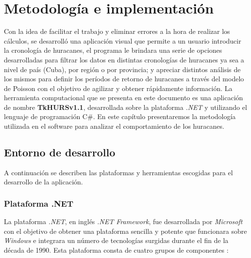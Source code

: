 \chapter{Metodología e implementación}
Con la idea de facilitar el trabajo y eliminar errores a la hora de realizar los cálculos, se desarrolló una aplicación visual que permite a un usuario introducir la cronología de huracanes, el programa le brindara una serie de opciones desarrolladas para filtrar los datos en distintas cronologías de huracanes ya sea a nivel de país (Cuba), por región o por provincia; y apreciar distintos análisis de los mismos para definir los períodos de retorno de huracanes a través del modelo de Poisson con el objetivo de agilizar y obtener rápidamente información. 
La herramienta computacional que se presenta en este documento es una aplicación de nombre \textbf{TkHURSv1.1}, desarrollada sobre la plataforma \textit{.NET} y utilizando el lenguaje de programación C\#. En este capítulo presentaremos la metodología utilizada en el software para analizar el comportamiento de los huracanes. 

\section{Entorno de desarrollo}
A continuación se describen las plataformas y herramientas escogidas para el desarrollo de la aplicación. 

\subsection{Plataforma .NET}

La plataforma  \textit{.NET}, en inglés \textit{.NET Framework}, fue desarrollada por \textit{Microsoft} con el objetivo de obtener una plataforma sencilla y potente que funcionara sobre \textit{Windows} e integrara un número de tecnologías surgidas durante el fin de la década de 1990. Esta plataforma consta de cuatro grupos de componentes \cite{DK2}:

